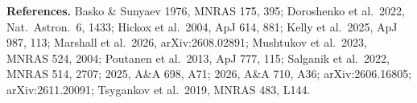 \documentclass[11pt]{article}
\begin{document}
\vspace{2pt}
{\footnotesize\textbf{References.}
Basko \& Sunyaev 1976, MNRAS 175, 395;
Doroshenko et al.\ 2022, Nat.\ Astron.\ 6, 1433;
Hickox et al.\ 2004, ApJ 614, 881;
Kelly et al.\ 2025, ApJ 987, 113;
Marshall et al.\ 2026, arXiv:2608.02891;
Mushtukov et al.\ 2023, MNRAS 524, 2004;
Poutanen et al.\ 2013, ApJ 777, 115;
Salganik et al.\ 2022, MNRAS 514, 2707; 2025, A\&A 698, A71; 2026, A\&A 710, A36;
arXiv:2606.16805; arXiv:2611.20091;
Tsygankov et al.\ 2019, MNRAS 483, L144.}
\end{document}
